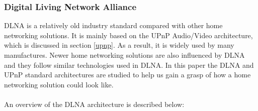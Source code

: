 \subsubsection[DLNA]{Digital Living Network Alliance} 
DLNA is a relatively old industry standard compared with other home networking 
solutions. It is mainly based on the UPnP Audio/Video architecture, which is 
discussed in section \ref{upnp}. As a result, it is widely used by many manufactures. Newer 
home networking solutions are also influenced by DLNA and they follow similar 
technologies used in DLNA. In this paper the DLNA and UPnP standard architectures are studied to help us gain a grasp of how a home networking solution could look like. \\
\\
An overview of the DLNA architecture \cite{dlna_guideline} is described below: 
